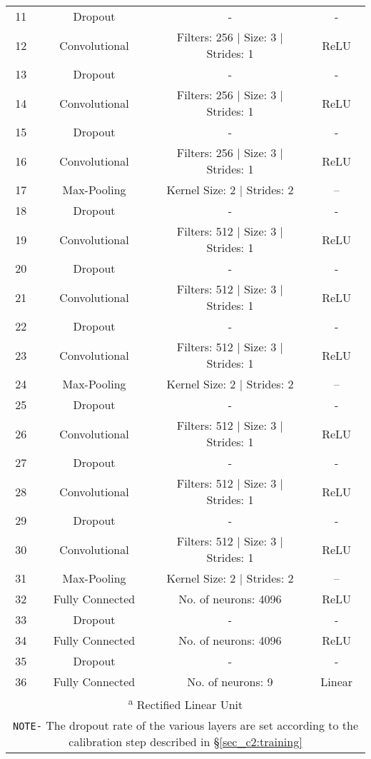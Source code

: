 \begin{longtable}{cccc}
        11 & Dropout & - & - \\
        12 & Convolutional & Filters: 256 $\vert$ Size: 3 $\vert$ Strides: 1 & ReLU \\
        13 & Dropout & - & - \\
        14 & Convolutional & Filters: 256 $\vert$ Size: 3 $\vert$ Strides: 1 & ReLU \\
        15 & Dropout & - & - \\
        16 & Convolutional & Filters: 256 $\vert$ Size: 3 $\vert$ Strides: 1 & ReLU \\
        17 & Max-Pooling & Kernel Size: 2 $\vert$ Strides: 2 & -- \\
        18 & Dropout & - & - \\
        19 & Convolutional & Filters: 512 $\vert$ Size: 3 $\vert$ Strides: 1 & ReLU \\
        20 & Dropout & - & - \\
        21 & Convolutional & Filters: 512 $\vert$ Size: 3 $\vert$ Strides: 1 & ReLU \\
        22 & Dropout & - & - \\
        23 & Convolutional & Filters: 512 $\vert$ Size: 3 $\vert$ Strides: 1 & ReLU \\
        24 & Max-Pooling & Kernel Size: 2 $\vert$ Strides: 2 & -- \\
        25 & Dropout & - & - \\
        26 & Convolutional & Filters: 512 $\vert$ Size: 3 $\vert$ Strides: 1 & ReLU \\
        27 & Dropout & - & - \\
        28 & Convolutional & Filters: 512 $\vert$ Size: 3 $\vert$ Strides: 1 & ReLU \\
        29 & Dropout & - & - \\
        30 & Convolutional & Filters: 512 $\vert$ Size: 3 $\vert$ Strides: 1 & ReLU \\
        31 & Max-Pooling & Kernel Size: 2 $\vert$ Strides: 2 & -- \\
        32 & Fully Connected & No. of neurons: 4096 & ReLU \\
        33 & Dropout & - & - \\
        34 & Fully Connected & No. of neurons: 4096 & ReLU \\
        35 & Dropout & - & - \\
        36 & Fully Connected & No. of neurons: 9 & Linear \\
        \hline 
        \multicolumn{4}{p{0.95\textwidth}}{\vspace{0.01cm} \small \textsuperscript{a} Rectified Linear Unit} \\
        \multicolumn{4}{p{0.95\textwidth}}{\small \texttt{NOTE-} The dropout rate of the various layers are set according to the calibration step described in \S \ref{sec_c2:training}} \\
\end{longtable}
